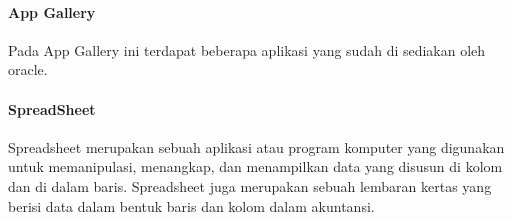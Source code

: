 \documentclass[a4paper,12pt]{report}
\begin{document}
\paragraph{App Gallery}
Pada App Gallery ini terdapat beberapa aplikasi yang sudah di sediakan oleh oracle.\\
\paragraph{SpreadSheet}
Spreadsheet merupakan sebuah aplikasi atau program komputer yang digunakan untuk memanipulasi, menangkap, dan menampilkan data yang disusun di kolom dan di dalam baris. Spreadsheet juga merupakan sebuah lembaran kertas yang berisi data dalam bentuk baris dan kolom dalam akuntansi.\\
\end{document}
